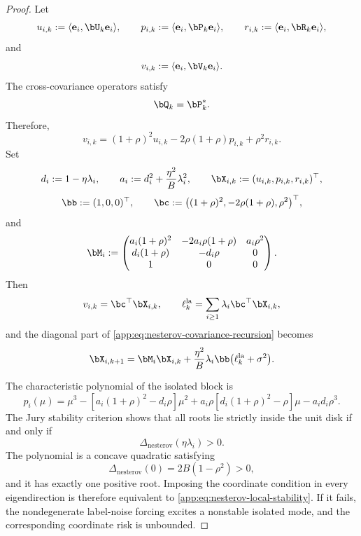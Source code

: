\documentclass[11pt]{article}
\newcommand{\nesterov}{\mathrm{nesterov}}
\newcommand{\la}{\mathrm{la}}
\begin{document}
\begin{proof}
Let
\[
u_{i,k}:=\langle\mathbf e_i,\bU_k\mathbf e_i\rangle,
\qquad
p_{i,k}:=\langle\mathbf e_i,\bP_k\mathbf e_i\rangle,
\qquad
r_{i,k}:=\langle\mathbf e_i,\bR_k\mathbf e_i\rangle,
\]
and
\[
v_{i,k}:=\langle\mathbf e_i,\bV_k\mathbf e_i\rangle.
\]
The cross-covariance operators satisfy
\[
\bQ_k=\bP_k^*.
\]
Therefore,
\[
v_{i,k}
=
(1+\rho)^2u_{i,k}
-
2\rho(1+\rho)p_{i,k}
+
\rho^2r_{i,k}.
\]
Set
\[
d_i:=1-\eta\lambda_i,
\qquad
a_i:=d_i^2+\frac{\eta^2}{B}\lambda_i^2,
\qquad
\bX_{i,k}:=(u_{i,k},p_{i,k},r_{i,k})^\top,
\]
\[
\bb:=(1,0,0)^\top,
\qquad
\bc:=\bigl((1+\rho)^2,-2\rho(1+\rho),\rho^2\bigr)^\top,
\]
and
\[
\bM_i
:=
\begin{pmatrix}
a_i(1+\rho)^2
&
-2a_i\rho(1+\rho)
&
a_i\rho^2
\\
d_i(1+\rho)
&
-d_i\rho
&
0
\\
1
&
0
&
0
\end{pmatrix}.
\]
Then
\[
v_{i,k}=\bc^\top\bX_{i,k},
\qquad
\ell_k^{\la}=\sum_{i\geq1}\lambda_i\bc^\top\bX_{i,k},
\]
and the diagonal part of \eqref{app:eq:nesterov-covariance-recursion} becomes
\begin{equation}
\label{app:eq:nesterov-block-recursion}
\bX_{i,k+1}
=
\bM_i\bX_{i,k}
+
\frac{\eta^2}{B}\lambda_i\bb\bigl(\ell_k^{\la}+\sigma^2\bigr).
\end{equation}

The characteristic polynomial of the isolated block is
\[
p_i(\mu)
=
\mu^3
-
\left[a_i(1+\rho)^2-d_i\rho\right]\mu^2
+
a_i\rho\left[d_i(1+\rho)^2-\rho\right]\mu
-
a_id_i\rho^3.
\]
The Jury stability criterion shows that all roots lie strictly inside the unit disk if and only if
\[
\Delta_{\nesterov}(\eta\lambda_i)>0.
\]
The polynomial is a concave quadratic satisfying
\[
\Delta_{\nesterov}(0)=2B(1-\rho^2)>0,
\]
and it has exactly one positive root. Imposing the coordinate condition in every eigendirection is
therefore equivalent to \eqref{app:eq:nesterov-local-stability}. If it fails,
the nondegenerate label-noise forcing excites a nonstable isolated mode, and the corresponding
coordinate risk is unbounded.


\end{proof}
\end{document}

